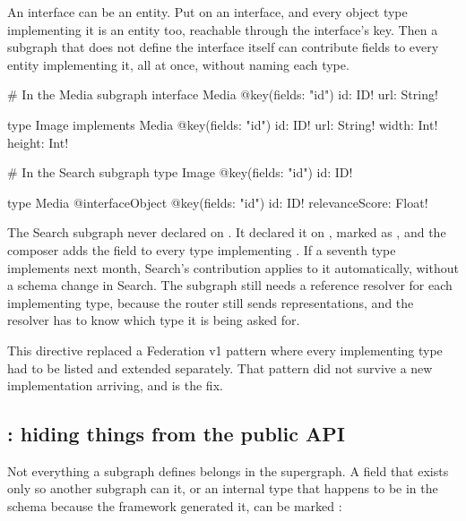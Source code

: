 %
%
An interface can be an entity. Put  on an interface, and every object
type implementing it is an entity too, reachable through the interface's key.
Then a subgraph that does not define the interface itself can contribute fields
to every entity implementing it, all at once, without naming each type.

\begin{graphqlsdl}
# In the Media subgraph
interface Media @key(fields: "id") {
  id: ID!
  url: String!
}

type Image implements Media @key(fields: "id") {
  id: ID!
  url: String!
  width: Int!
  height: Int!
}

# In the Search subgraph
type Image @key(fields: "id") {
  id: ID!
}

type Media @interfaceObject @key(fields: "id") {
  id: ID!
  relevanceScore: Float!
}
\end{graphqlsdl}

%
The Search subgraph never declared 
on . It declared it on , marked
as , and the composer adds the field to every type
implementing . If a
seventh type implements  next month, Search's contribution applies
to it automatically, without a schema change in Search. The subgraph still needs
a reference resolver for each implementing type, because the router still sends
representations, and the resolver has to know which type it is being asked for.

%
This directive replaced a Federation v1 pattern where every implementing type
had to be listed and extended separately. That pattern did not survive a new
implementation arriving, and  is the fix.

\subsection*{: hiding things from the public API}

%
Not everything a subgraph defines belongs in the supergraph. A field that exists
only so another subgraph can  it, or an internal type that
happens to be in the schema because the framework generated it, can be marked
:

